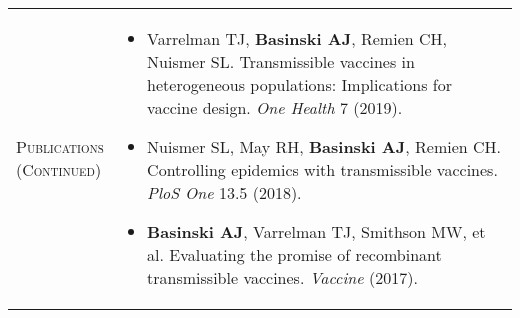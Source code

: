 \documentclass[11pt]{article}
\newcommand{\cellone}{3.5cm} %
\newcommand{\celltwo}{11cm}
\newcommand{\spa}{\vspace{.4in}}
\begin{document}
\newpage

\begin{tabularx}{\textwidth}{p{\cellone} p{\celltwo}}
  \parbox[t][0cm]{\cellone}{P\textsc{ublications} \\ \textsc{(Continued)}} &  \parbox[t][0cm]{12cm}{ 

    \vspace{-0.65cm}
    \begin{itemize}

    \item Varrelman TJ, {\bf Basinski AJ}, Remien CH, Nuismer SL. Transmissible vaccines in heterogeneous populations: Implications for vaccine design. \emph{One Health} 7 (2019).
          
    \item Nuismer SL, May RH, {\bf Basinski AJ}, Remien CH. Controlling epidemics with transmissible vaccines. \emph{PloS One} 13.5 (2018).
      
      \vspace{0.05in}
      
    \item {\bf Basinski AJ}, Varrelman TJ, Smithson MW, et al. Evaluating the promise of recombinant transmissible vaccines. \emph{Vaccine} (2017).
      
    \end{itemize}
  }
\end{tabularx}

\spa
\spa
\spa
\spa
\spa
\end{document}
